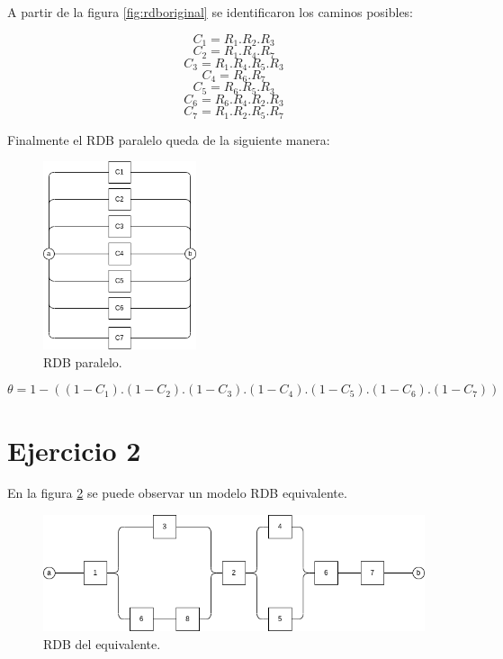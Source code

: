 \documentclass[
    11pt,
    spanish,
    a4paper
]{article}
\begin{document}
A partir de la figura \ref{fig:rdboriginal} se identificaron los caminos posibles:

$$ C_1 = R_1 . R_2 . R_3 $$
$$ C_2 = R_1 . R_4 . R_7 $$
$$ C_3 = R_1 . R_4 . R_5 . R_3 $$
$$ C_4 = R_6 . R_7 $$
$$ C_5 = R_6 . R_5 . R_3 $$
$$ C_6 = R_6 . R_4 . R_2 .R_3 $$
$$ C_7 = R_1 . R_2 . R_5 .R_7 $$

Finalmente el RDB paralelo queda de la siguiente manera:

\begin{figure}[htbp]
	\centering
	\includegraphics[width=0.4\textwidth]{img/rdb_paralelo.png}
	\caption{RDB paralelo.}
	\label{fig:rdbparalelo}
\end{figure}

\begin{dmath}
	\theta = 1 - ((1 - C_1).(1-C_2).(1-C_3).(1-C_4).(1-C_5).(1-C_6).(1-C_7))
\end{dmath}

\section{Ejercicio 2}

En la figura \ref{fig:rdbequivalente} se puede observar un modelo RDB equivalente.

\begin{figure}[htbp]
	\centering
	\includegraphics[width=\textwidth]{img/rdb2.png}
	\caption{RDB del equivalente.}
	\label{fig:rdbequivalente}
\end{figure}
\end{document}

